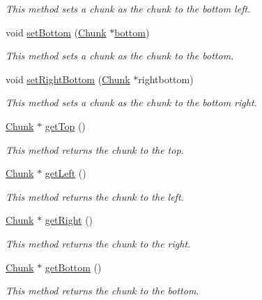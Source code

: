 \begin{DoxyCompactItemize}
\begin{DoxyCompactList}\small\item\em This method sets a chunk as the chunk to the bottom left. \end{DoxyCompactList}\item 
void \hyperlink{class_chunk_a57c85ac8a8959eca362b7c3e64dc1d0d}{set\-Bottom} (\hyperlink{class_chunk}{Chunk} $\ast$\hyperlink{_chunk_8hpp_ab91b34ae619fcdfcba4522b4f335bf83a692ac8f8a4a43ac2513ce4cd90dc3ebe}{bottom})
\begin{DoxyCompactList}\small\item\em This method sets a chunk as the chunk to the bottom. \end{DoxyCompactList}\item 
void \hyperlink{class_chunk_aadab4832f4d1c4618b7232a1503d8aed}{set\-Right\-Bottom} (\hyperlink{class_chunk}{Chunk} $\ast$rightbottom)
\begin{DoxyCompactList}\small\item\em This method sets a chunk as the chunk to the bottom right. \end{DoxyCompactList}\item 
\hyperlink{class_chunk}{Chunk} $\ast$ \hyperlink{class_chunk_a161929ca5dcfa0e1a798999f989fe2f8}{get\-Top} ()
\begin{DoxyCompactList}\small\item\em This method returns the chunk to the top. \end{DoxyCompactList}\item 
\hyperlink{class_chunk}{Chunk} $\ast$ \hyperlink{class_chunk_a43c3b2b5995d06baec16ab9935a315fa}{get\-Left} ()
\begin{DoxyCompactList}\small\item\em This method returns the chunk to the left. \end{DoxyCompactList}\item 
\hyperlink{class_chunk}{Chunk} $\ast$ \hyperlink{class_chunk_ad13a4e8ac481c7de6a70b3fa461418cf}{get\-Right} ()
\begin{DoxyCompactList}\small\item\em This method returns the chunk to the right. \end{DoxyCompactList}\item 
\hyperlink{class_chunk}{Chunk} $\ast$ \hyperlink{class_chunk_a59eb282f08711420c1e966e30aab47e3}{get\-Bottom} ()
\begin{DoxyCompactList}\small\item\em This method returns the chunk to the bottom. \end{DoxyCompactList}\item 

\end{DoxyCompactItemize}

